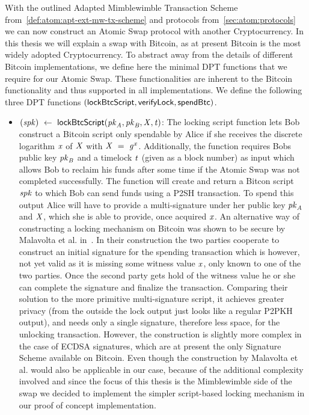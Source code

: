 With the outlined Adapted Mimblewimble Transaction Scheme from~\cref{def:atom:apt-ext-mw-tx-scheme} and protocols from~\cref{sec:atom:protocols} we can now construct an Atomic Swap protocol with another Cryptocurrency.
In this thesis we will explain a swap with Bitcoin, as at present Bitcoin is the most widely adopted Cryptocurrency.
To abstract away from the details of different Bitcoin implementations, we define here the minimal DPT functions that we require for our Atomic Swap.
These functionalities are inherent to the Bitcoin functionality and thus supported in all implementations.
We define the following three DPT functions $(\mathsf{lockBtcScript}, \mathsf{verifyLock}, \mathsf{spendBtc})$.
\begin{itemize}
    \item $(\mathit{spk}) ~\leftarrow~ \mathsf{lockBtcScript} (\mathit{pk}_{\mathit{A}},\mathit{pk}_{\mathit{B}},\mathit{X},\mathit{t})$:
    The locking script function lets Bob construct a Bitcoin script only spendable by Alice if she receives the discrete logarithm $\mathit{x}$ of $\mathit{X}$ with $\mathit{X} ~=~ \mathit{g}^{\mathit{x}}$.
    Additionally, the function requires Bobs public key $\mathit{pk}_{\mathit{B}}$ and a timelock $\mathit{t}$ (given as a block number) as input which allows Bob to reclaim his funds after some time if the Atomic Swap was not completed successfully.
    The function will create and return a Bitcon script $\mathit{spk}$ to which Bob can send funds using a P2SH transaction.
    To spend this output Alice will have to provide a multi-signature under her public key $\mathit{pk}_{\mathit{A}}$ and $\mathit{X}$, which she is able to provide, once acquired $\mathit{x}$.
    An alternative way of constructing a locking mechanism on Bitcoin was shown to be secure by Malavolta et al. in~\cite{malavolta2019anonymous}.
    In their construction the two parties cooperate to construct an initial signature for the spending transaction which is however, not yet valid as it is missing some witness value $\mathit{x}$, only known to one of the two parties.
    Once the second party gets hold of the witness value he or she can complete the signature and finalize the transaction.
    Comparing their solution to the more primitive multi-signature script, it achieves greater privacy (from the outside the lock output just looks like a regular P2PKH output), and needs only a single signature, therefore less space, for the unlocking transaction.
    However, the construction is slightly more complex in the case of ECDSA signatures, which are at present the only Signature Scheme available on Bitcoin.
    Even though the construction by Malavolta et al. would also be applicable in our case, because of the additional complexity involved and since the focus of this thesis is the Mimblewimble side of the swap we decided to implement the simpler script-based locking mechanism in our proof of concept implementation.

\end{itemize}

